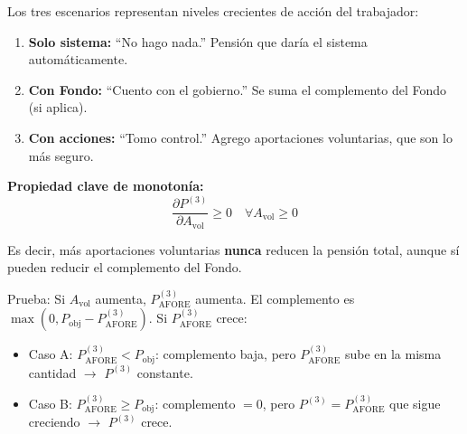 \documentclass[11pt,a4paper]{report}
\theoremstyle{remark}
\begin{document}
\begin{tcolorbox}[colback=green!5!white, colframe=green!50!black, title=\textbf{Intuici\'on}]
Los tres escenarios representan niveles crecientes de acci\'on del trabajador:
\begin{enumerate}
  \item \textbf{Solo sistema:} ``No hago nada.'' Pensi\'on que dar\'ia el sistema autom\'aticamente.
  \item \textbf{Con Fondo:} ``Cuento con el gobierno.'' Se suma el complemento del Fondo (si aplica).
  \item \textbf{Con acciones:} ``Tomo control.'' Agrego aportaciones voluntarias, que son lo m\'as seguro.
\end{enumerate}

\textbf{Propiedad clave de monoton\'ia:}
\begin{equation}
\frac{\partial P^{(3)}}{\partial A_{\text{vol}}} \geq 0 \quad \forall A_{\text{vol}} \geq 0
\end{equation}

Es decir, m\'as aportaciones voluntarias \textbf{nunca} reducen la pensi\'on total, aunque s\'i pueden reducir el complemento del Fondo.

Prueba: Si $A_{\text{vol}}$ aumenta, $P^{(3)}_{\text{AFORE}}$ aumenta. El complemento es $\max(0, P_{\text{obj}} - P^{(3)}_{\text{AFORE}})$. Si $P^{(3)}_{\text{AFORE}}$ crece:
\begin{itemize}
  \item Caso A: $P^{(3)}_{\text{AFORE}} < P_{\text{obj}}$: complemento baja, pero $P^{(3)}_{\text{AFORE}}$ sube en la misma cantidad $\to$ $P^{(3)}$ constante.
  \item Caso B: $P^{(3)}_{\text{AFORE}} \geq P_{\text{obj}}$: complemento $= 0$, pero $P^{(3)} = P^{(3)}_{\text{AFORE}}$ que sigue creciendo $\to$ $P^{(3)}$ crece.
\end{itemize}
\end{tcolorbox}
\end{document}
